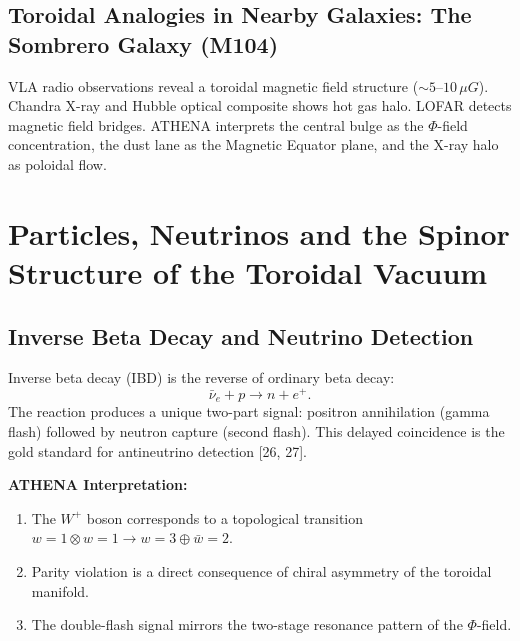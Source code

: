 \documentclass[12pt, a4paper]{article}
\begin{document}
\subsection{Toroidal Analogies in Nearby Galaxies: The Sombrero Galaxy (M104)}
VLA radio observations reveal a toroidal magnetic field structure ($\sim 5$--$10\,\mu G$). Chandra X-ray and Hubble optical composite shows hot gas halo. LOFAR detects magnetic field bridges. ATHENA interprets the central bulge as the $\Phi$-field concentration, the dust lane as the Magnetic Equator plane, and the X-ray halo as poloidal flow.

\section{Particles, Neutrinos and the Spinor Structure of the Toroidal Vacuum}
\label{sec:particles_spinor}

\subsection{Inverse Beta Decay and Neutrino Detection}
\label{sec:ibd}
Inverse beta decay (IBD) is the reverse of ordinary beta decay:
\begin{equation}
\bar{\nu}_e + p \rightarrow n + e^+.
\label{eq:ibd}
\end{equation}
The reaction produces a unique two-part signal: positron annihilation (gamma flash) followed by neutron capture (second flash). This delayed coincidence is the gold standard for antineutrino detection [26, 27].

\textbf{ATHENA Interpretation:}
\begin{enumerate}
    \item The $W^+$ boson corresponds to a topological transition $w=1 \otimes w=1 \to w=3 \oplus \bar{w}=2$.
    \item Parity violation is a direct consequence of chiral asymmetry of the toroidal manifold.
    \item The double-flash signal mirrors the two-stage resonance pattern of the $\Phi$-field.
\end{enumerate}
\end{document}
